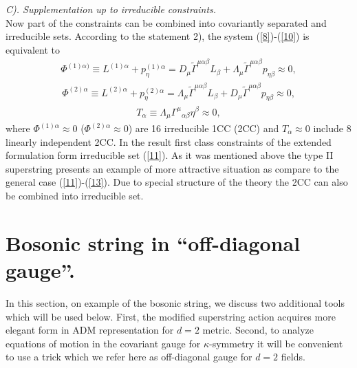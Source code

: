 \documentclass[a4paper]{article}
\begin{document}
{\em C). Supplementation up to irreducible constraints.} \\ 
Now part of the constraints can be combined into covariantly separated
and irreducible sets. According to the statement 2), the system 
(\ref{8})-(\ref{10}) is equivalent to
\begin{eqnarray}\label{11}
\Phi^{(1)\alpha)}\equiv L^{(1)\alpha}+p^{(1)\alpha}_\eta=D_\mu
\tilde\Gamma^{\mu\alpha\beta}L_\beta+\Lambda_\mu
\tilde\Gamma^{\mu\alpha\beta} p_{\eta\beta}\approx 0,
\end{eqnarray} 
\begin{eqnarray}\label{12}
\Phi^{(2)\alpha}\equiv L^{(2)\alpha}+p^{(2)\alpha}_\eta=\Lambda_\mu
\tilde\Gamma^{\mu\alpha\beta}L_\beta+D_\mu
\tilde\Gamma^{\mu\alpha\beta} p_{\eta\beta}\approx0, 
\end{eqnarray}
\begin{eqnarray}\label{13}
T_\alpha\equiv \Lambda_\mu{\Gamma^\mu}_{\alpha\beta}\eta^\beta
\approx0,
\end{eqnarray}
where $\Phi^{(1)\alpha}\approx0$ 
($\Phi^{(2)\alpha}\approx0$) are 16 irreducible 1CC
(2CC) and $T_\alpha\approx0$ include 8 linearly independent 2CC.
In the result first class constraints of the extended formulation form 
irreducible set (\ref{11}). As it was mentioned above the type II 
superstring presents an example of more attractive
situation as compare to the general case (\ref{11})-(\ref{13}). Due to
special structure of the theory the 2CC can also be combined into
irreducible set.

\section{Bosonic string in ``off-diagonal gauge''.}

In this section, on example of the bosonic string, we discuss two 
additional tools which will be used below. First, the modified 
superstring action acquires more elegant form in ADM representation 
for $d=2$ metric. Second, to analyze equations of motion in the covariant 
gauge for $\kappa$-symmetry it will be convenient to use a trick which 
we refer here as off-diagonal gauge for $d=2$ fields.
\end{document}
